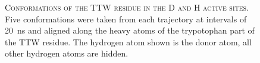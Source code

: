 \begin{figure}
    \centering
    \caption[Conformations of the TTW residue in the D and H active sites]{\textsc{Conformations of the TTW residue in the D and H active sites}. Five conformations were taken from each trajectory at intervals of \SI{20}{\nano\second} and aligned along the heavy atoms of the trypotophan part of the TTW residue.  The hydrogen atom shown is the donor atom, all other hydrogen atoms are hidden.}
    \label{fig:ttw_wiggle}
\end{figure}

